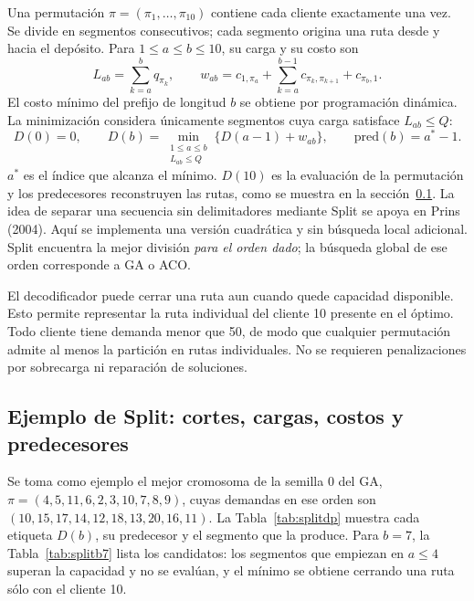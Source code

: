 \documentclass[11pt,a4paper]{article}
\numberwithin{equation}{section}
\begin{document}
Una permutación \(\pi=(\pi_1,\dots,\pi_{10})\) contiene cada cliente exactamente una vez. Se divide en segmentos consecutivos; cada segmento origina una ruta desde y hacia el depósito. Para \(1\le a\le b\le 10\), su carga y su costo son
\begin{equation}\label{eq:seg}
L_{ab}=\sum_{k=a}^{b} q_{\pi_k},\qquad w_{ab}=c_{1,\pi_a}+\sum_{k=a}^{b-1} c_{\pi_k,\pi_{k+1}}+c_{\pi_b,1}.
\end{equation}
El costo mínimo del prefijo de longitud \(b\) se obtiene por programación dinámica. La minimización considera únicamente segmentos cuya carga satisface \(L_{ab}\le Q\):
\begin{equation}\label{eq:split}
D(0)=0,\qquad D(b)=\min_{\substack{1\le a\le b\\ L_{ab}\le Q}}\{D(a-1)+w_{ab}\},\qquad \mathrm{pred}(b)=a^*-1 .
\end{equation}
\(a^*\) es el índice que alcanza el mínimo. \(D(10)\) es la evaluación de la permutación y los predecesores reconstruyen las rutas, como se muestra en la sección~\ref{sec:ejsplit}. La idea de separar una secuencia sin delimitadores mediante Split se apoya en Prins (2004). Aquí se implementa una versión cuadrática y sin búsqueda local adicional. Split encuentra la mejor división \emph{para el orden dado}; la búsqueda global de ese orden corresponde a GA o ACO.

El decodificador puede cerrar una ruta aun cuando quede capacidad disponible. Esto permite representar la ruta individual del cliente 10 presente en el óptimo. Todo cliente tiene demanda menor que 50, de modo que cualquier permutación admite al menos la partición en rutas individuales. No se requieren penalizaciones por sobrecarga ni reparación de soluciones.

\subsection{Ejemplo de Split: cortes, cargas, costos y predecesores}\label{sec:ejsplit}

Se toma como ejemplo el mejor cromosoma de la semilla 0 del GA, \(\pi=(4,5,11,6,2,3,10,7,8,9)\), cuyas demandas en ese orden son \((10,15,17,14,12,18,13,20,16,11)\). La Tabla~\ref{tab:splitdp} muestra cada etiqueta \(D(b)\), su predecesor y el segmento que la produce. Para \(b=7\), la Tabla~\ref{tab:splitb7} lista los candidatos: los segmentos que empiezan en \(a\le 4\) superan la capacidad y no se evalúan, y el mínimo se obtiene cerrando una ruta sólo con el cliente 10.
\end{document}
